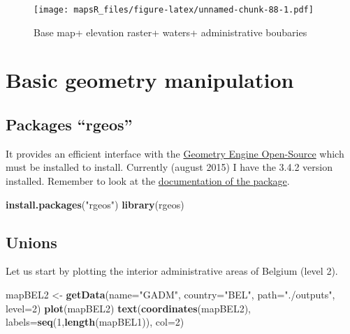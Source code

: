 \documentclass[]{report}
\newenvironment{Shaded}{\begin{snugshade}}{\end{snugshade}}
\newcommand{\KeywordTok}[1]{\textcolor[rgb]{0.13,0.29,0.53}{\textbf{{#1}}}}
\newcommand{\DataTypeTok}[1]{\textcolor[rgb]{0.13,0.29,0.53}{{#1}}}
\newcommand{\DecValTok}[1]{\textcolor[rgb]{0.00,0.00,0.81}{{#1}}}
\newcommand{\StringTok}[1]{\textcolor[rgb]{0.31,0.60,0.02}{{#1}}}
\newcommand{\NormalTok}[1]{{#1}}
\begin{document}
\begin{figure}[htbp]
\centering
\texttt{[image: mapsR\_files/figure-latex/unnamed-chunk-88-1.pdf]}
\caption{Base map+ elevation raster+ waters+ administrative boubaries}
\end{figure}

\chapter{Basic geometry manipulation}\label{basic-geometry-manipulation}

\section{\texorpdfstring{Packages
``rgeos''}{Packages rgeos}}\label{packages-rgeos}

It provides an efficient interface with the
\href{http://trac.osgeo.org/geos/}{Geometry Engine Open-Source} which
must be installed to install. Currently (august 2015) I have the 3.4.2
version installed. Remember to look at the
\href{http://cran.r-project.org/web/packages/rgeos/rgeos.pdf}{documentation
of the package}.

\begin{Shaded}
\begin{Highlighting}[]
\KeywordTok{install.packages}\NormalTok{(}\StringTok{"rgeos"}\NormalTok{)}
\KeywordTok{library}\NormalTok{(rgeos)}
\end{Highlighting}
\end{Shaded}

\section{Unions}\label{unions}

Let us start by plotting the interior administrative areas of Belgium
(level 2).

\begin{Shaded}
\begin{Highlighting}[]
\NormalTok{mapBEL2 <-}\StringTok{ }\KeywordTok{getData}\NormalTok{(}\DataTypeTok{name=}\StringTok{"GADM"}\NormalTok{, }\DataTypeTok{country=}\StringTok{"BEL"}\NormalTok{, }\DataTypeTok{path=}\StringTok{"./outputs"}\NormalTok{, }\DataTypeTok{level=}\DecValTok{2}\NormalTok{)}
\KeywordTok{plot}\NormalTok{(mapBEL2)}
\KeywordTok{text}\NormalTok{(}\KeywordTok{coordinates}\NormalTok{(mapBEL2), }\DataTypeTok{labels=}\KeywordTok{seq}\NormalTok{(}\DecValTok{1}\NormalTok{,}\KeywordTok{length}\NormalTok{(mapBEL1)), }\DataTypeTok{col=}\DecValTok{2}\NormalTok{)}
\end{Highlighting}
\end{Shaded}
\end{document}
